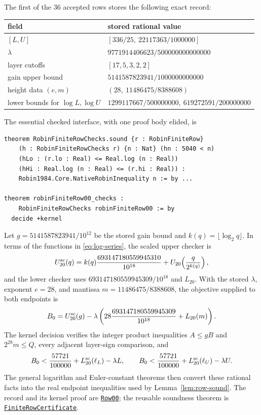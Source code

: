 \documentclass[11pt]{amsart}
\theoremstyle{definition}
\theoremstyle{remark}
\numberwithin{equation}{section}
\newcommand{\repositoryurl}{https://github.com/kimihiro64/Robin1984}
\newcommand{\proofrevision}{b359826e62c50b6cef55db4b2fcab793232498cc}
\newcommand{\codelink}[2]{%
  \href{\repositoryurl/blob/\proofrevision/#1}{\texttt{#2}}}
\begin{document}
The first of the 36 accepted rows stores the following exact record:
\begin{center}
\small
\begin{tabular}{@{}ll@{}}
\toprule
field & stored rational value \\
\midrule
$[L,U]$ & $[336/25,\ 22117363/1000000]$ \\
$\lambda$ & $9771914406623/500000000000000$ \\
layer cutoffs & $[17,5,3,2,2]$ \\
gain upper bound & $5141587823941/1000000000000$ \\
height data $(e,m)$ & $(28,\ 11486475/8388608)$ \\
lower bounds for $\log L,\log U$
  & $1299117667/500000000,\ 619272591/200000000$ \\
\bottomrule
\end{tabular}
\end{center}

The essential checked interface, with one proof body elided, is
\begin{verbatim}
theorem RobinFiniteRowChecks.sound {r : RobinFiniteRow}
    (h : RobinFiniteRowChecks r) {n : Nat} (hn : 5040 < n)
    (hLo : (r.lo : Real) <= Real.log (n : Real))
    (hHi : Real.log (n : Real) <= (r.hi : Real)) :
    Robin1984.Core.NativeRobinInequality n := by ...

theorem robinFiniteRow00_checks :
    RobinFiniteRowChecks robinFiniteRow00 := by
  decide +kernel
\end{verbatim}
Let $g=5141587823941/10^{12}$ be the stored gain bound and
$k(q)=\lfloor\log_2q\rfloor$.  In terms of the functions in
\eqref{eq:log-series}, the scaled upper checker is
\[
 U^{\rm sc}_{20}(q)=
 k(q)\frac{693147180559945310}{10^{18}}
 +U_{20}\!\left(\frac{q}{2^{k(q)}}\right),
\]
and the lower checker uses
$693147180559945309/10^{18}$ and $L_{20}$.  With the stored
$\lambda$, exponent $e=28$, and mantissa $m=11486475/8388608$, the
objective supplied to both endpoints is
\[
 B_0=U^{\rm sc}_{20}(g)
 -\lambda\left(
 28\frac{693147180559945309}{10^{18}}+L_{20}(m)\right).
\]
The kernel decision verifies the integer product inequalities
$A\le gB$ and $2^{28}m\le Q$, every adjacent layer-sign comparison, and
\[
 B_0<
 \frac{57721}{100000}+L^{\rm sc}_{20}(\ell_L)-\lambda L,
 \qquad
 B_0<
 \frac{57721}{100000}+L^{\rm sc}_{20}(\ell_U)-\lambda U.
\]
The general logarithm and Euler-constant theorems then convert these
rational facts into the real endpoint inequalities used by
Lemma~\ref{lem:row-sound}.  The record and its kernel proof are
\codelink{Robin1984/Finite/Certificates/Row00.lean}{Row00}; the reusable
soundness theorem is
\codelink{Robin1984/Finite/FiniteRowCertificate.lean}{FiniteRowCertificate}.
\end{document}
